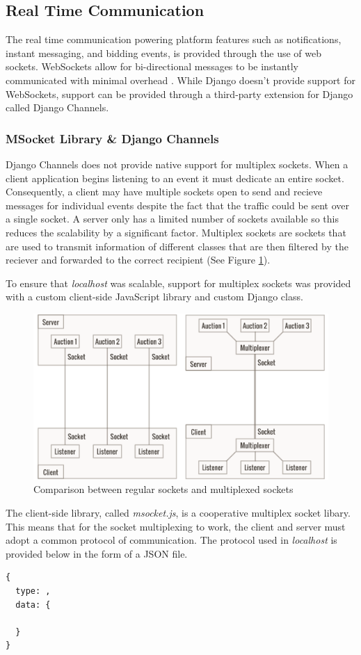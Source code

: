 \subsection{Real Time Communication}\label{realtime}

The real time communication powering platform features such as notifications,
instant messaging, and bidding events, is provided through the use of web
sockets. WebSockets allow for bi-directional messages to be instantly
communicated with minimal overhead \parencite{websocket}. While Django doesn't
provide support for WebSockets, support can be provided through a third-party
extension for Django called Django Channels.

\subsubsection{MSocket Library \& Django Channels}

Django Channels does not provide native support for multiplex sockets. When
a client application begins listening to an event it must dedicate an entire
socket. Consequently, a client may have multiple sockets open to send and
recieve messages for individual events despite the fact that the traffic could
be sent over a single socket. A server only has a limited number of sockets
available so this reduces the scalability by a significant factor. Multiplex
sockets are sockets that are used to transmit information of different classes
that are then filtered by the reciever and forwarded to the correct recipient
(See Figure \ref{fig:msocket}).

To ensure that \emph{localhost} was scalable, support for multiplex sockets
was provided with a custom client-side JavaScript library and custom Django
class.
\begin{figure}[!h]
  \includegraphics[width=\linewidth]{assets/msocket.png}
  \caption{Comparison between regular sockets and multiplexed sockets}
  \label{fig:msocket}
\end{figure}
The client-side library, called \emph{msocket.js}, is a cooperative multiplex
socket libary. This means that for the socket multiplexing to work, the client
and server must adopt a common protocol of communication. The protocol used
in \emph{localhost} is provided below in the form of a JSON file.
\begin{lstlisting}
{
  type: ,
  data: {

  }
}
\end{lstlisting}

